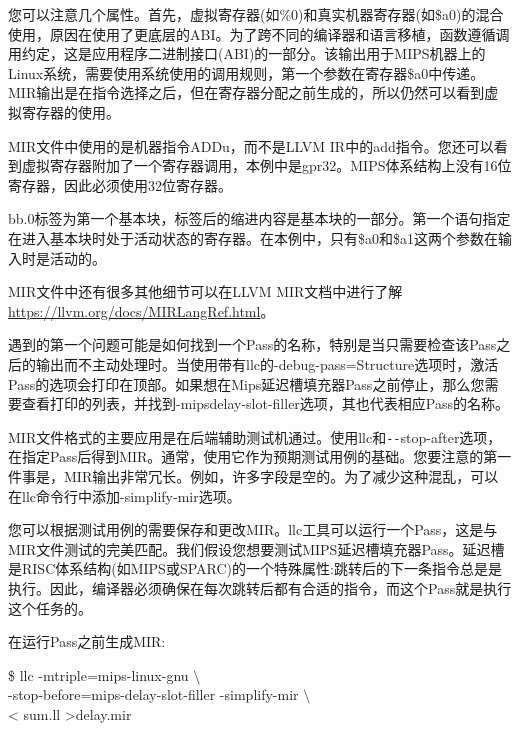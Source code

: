 您可以注意几个属性。首先，虚拟寄存器(如\%0)和真实机器寄存器(如\$a0)的混合使用，原因在使用了更底层的ABI。为了跨不同的编译器和语言移植，函数遵循调用约定，这是应用程序二进制接口(ABI)的一部分。该输出用于MIPS机器上的Linux系统，需要使用系统使用的调用规则，第一个参数在寄存器\$a0中传递。MIR输出是在指令选择之后，但在寄存器分配之前生成的，所以仍然可以看到虚拟寄存器的使用。\par

MIR文件中使用的是机器指令ADDu，而不是LLVM IR中的add指令。您还可以看到虚拟寄存器附加了一个寄存器调用，本例中是gpr32。MIPS体系结构上没有16位寄存器，因此必须使用32位寄存器。\par

bb.0标签为第一个基本块，标签后的缩进内容是基本块的一部分。第一个语句指定在进入基本块时处于活动状态的寄存器。在本例中，只有\$a0和\$a1这两个参数在输入时是活动的。\par

MIR文件中还有很多其他细节可以在LLVM MIR文档中进行了解 \url{https://llvm.org/docs/MIRLangRef.html}。\par

遇到的第一个问题可能是如何找到一个Pass的名称，特别是当只需要检查该Pass之后的输出而不主动处理时。当使用带有llc的-debug-pass=Structure选项时，激活Pass的选项会打印在顶部。如果想在Mips延迟槽填充器Pass之前停止，那么您需要查看打印的列表，并找到-mipsdelay-slot-filler选项，其也代表相应Pass的名称。\par

MIR文件格式的主要应用是在后端辅助测试机通过。使用llc和\verb|--|stop-after选项，在指定Pass后得到MIR。通常，使用它作为预期测试用例的基础。您要注意的第一件事是，MIR输出非常冗长。例如，许多字段是空的。为了减少这种混乱，可以在llc命令行中添加-simplify-mir选项。\par

您可以根据测试用例的需要保存和更改MIR。llc工具可以运行一个Pass，这是与MIR文件测试的完美匹配。我们假设您想要测试MIPS延迟槽填充器Pass。延迟槽是RISC体系结构(如MIPS或SPARC)的一个特殊属性:跳转后的下一条指令总是是执行。因此，编译器必须确保在每次跳转后都有合适的指令，而这个Pass就是执行这个任务的。\par

在运行Pass之前生成MIR:\par

\begin{tcolorbox}[colback=white,colframe=black]
\$ llc -mtriple=mips-linux-gnu $\setminus$ \\
\hspace*{2cm}-stop-before=mips-delay-slot-filler -simplify-mir $\setminus$ \\
\hspace*{2cm}< sum.ll >delay.mir
\end{tcolorbox}

